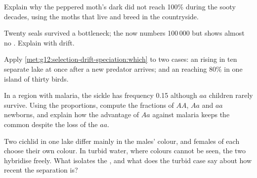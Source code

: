 \begin{exercise}[$\star\star$]\label{exo:g12:selection-drift-speciation:9}
Explain why the peppered moth's dark  did not reach 100\% during
the sooty decades, using the moths that live and breed in the
countryside.
\end{exercise}

\begin{exercise}[$\star\star$]\label{exo:g12:selection-drift-speciation:10}
Twenty seals survived a bottleneck; the  now numbers 100\,000
but shows almost no . Explain with drift.
\end{exercise}

\begin{exercise}[$\star\star$]\label{exo:g12:selection-drift-speciation:11}
Apply \cref{met:g12:selection-drift-speciation:which} to two cases: an
 rising in ten separate lake  at once after a new
predator arrives; and an  reaching 80\% in one island 
of thirty birds.
\end{exercise}

\begin{exercise}[$\star\star\star$]\label{exo:g12:selection-drift-speciation:12}
In a region with malaria, the sickle  has frequency 0.15
although $aa$ children rarely survive. Using the 
proportions, compute the fractions of $AA$, $Aa$ and $aa$ newborns,
and explain how the advantage of $Aa$ against malaria keeps the
 common despite the loss of the $aa$.
\end{exercise}

\begin{exercise}[$\star\star\star$]\label{exo:g12:selection-drift-speciation:13}
Two cichlid  in one lake differ mainly in the males' colour,
and females of each choose their own colour. In turbid water, where
colours cannot be seen, the two hybridise freely. What isolates the
, and what does the turbid case say about how recent the
separation is?
\end{exercise}

